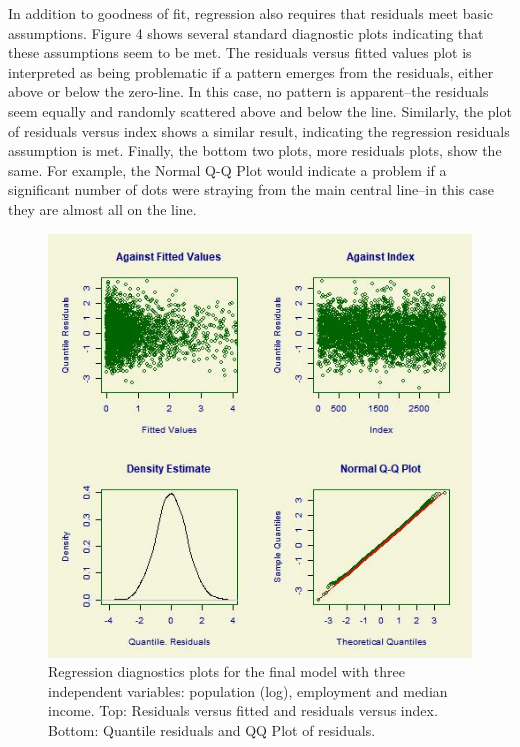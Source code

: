 \documentclass[sigconf]{acmart}
\begin{document}
In addition to goodness of fit, regression also requires that residuals meet basic assumptions.  Figure 4 shows several standard diagnostic plots indicating that these assumptions seem to be met.  The residuals versus fitted values plot is interpreted as being problematic if a pattern emerges from the residuals, either above or below the zero-line.  In this case, no pattern is apparent--the residuals seem equally and randomly scattered above and below the line.  Similarly, the plot of residuals versus index shows a similar result, indicating the regression residuals assumption is met.  Finally, the bottom two plots, more residuals plots, show the same.  For example, the Normal Q-Q Plot would indicate a problem if a significant number of dots were straying from the main central line--in this case they are almost all on the line. \cite{hocking}

\begin{figure}
\includegraphics[width=1.0\textwidth]{images/figure4.jpg}
\caption{Regression diagnostics plots for the final model with three independent variables: population (log), employment and median income. Top: Residuals versus fitted and residuals versus index.  Bottom: Quantile residuals and QQ Plot of residuals. }
\end{figure}
\end{document}
